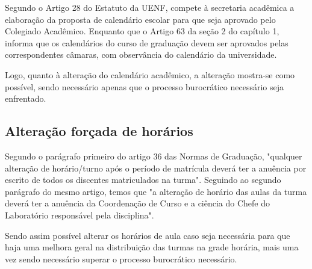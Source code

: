 
Segundo o Artigo 28 do Estatuto da UENF, compete à secretaria acadêmica a elaboração da proposta de calendário escolar para que seja aprovado pelo Colegiado Acadêmico. Enquanto que o Artigo 63 da seção 2 do capítulo 1, informa que os calendários do curso de graduação devem ser aprovados pelas correspondentes câmaras, com observância do calendário da universidade.

Logo, quanto à alteração do calendário acadêmico, a alteração mostra-se como possível, sendo necessário apenas que o processo burocrático necessário seja enfrentado.

\subsection{Alteração forçada de horários} %

Segundo o parágrafo primeiro do artigo 36 das Normas de Graduação, "qualquer alteração de horário/turno após o período de matrícula deverá ter a anuência por escrito de todos os discentes matriculados na turma". Seguindo ao segundo parágrafo do mesmo artigo, temos que "a alteração de horário das aulas da turma deverá ter a anuência da Coordenação de Curso e a ciência do Chefe do Laboratório responsável pela disciplina".

Sendo assim possível alterar os horários de aula caso seja necessária para que haja uma melhora geral na distribuição das turmas na grade horária, mais uma vez sendo necessário superar o processo burocrático necessário.
